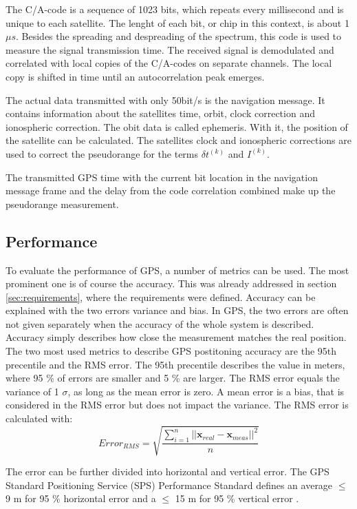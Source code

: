 The C/A-code is a sequence of 1023 bits, which repeats every millisecond and is unique to each satellite.
The lenght of each bit, or chip in this context, is about 1 $\mu s$.
Besides the spreading and despreading of the spectrum, this code is used to measure the signal transmission time.
The received signal is demodulated and correlated with local copies of the C/A-codes on separate channels.
The local copy is shifted in time until an autocorrelation peak emerges.

The actual data transmitted with only 50bit/s is the navigation message.
It contains information about the satellites time, orbit, clock correction and ionospheric correction.
The obit data is called ephemeris.
With it, the position of the satellite can be calculated.
The satellites clock and ionospheric corrections are used to correct the pseudorange for the terms $\delta t^{(k)}$ and $I^{(k)}$.

The transmitted GPS time with the current bit location in the navigation message frame and the delay from the code correlation combined make up the pseudorange measurement.

\subsection{Performance}

To evaluate the performance of GPS, a number of metrics can be used.
The most prominent one is of course the accuracy.
This was already addressed in section \ref{sec:requirements}, where the requirements were defined.
Accuracy can be explained with the two errors variance and bias.
In GPS, the two errors are often not given separately when the accuracy of the whole system is described.
Accuracy simply describes how close the measurement matches the real position.
The two most used metrics to describe GPS postitoning accuracy are the 95th precentile and the RMS error.
The 95th precentile describes the value in meters, where 95 \% of errors are smaller and 5 \% are larger.
The RMS error equals the variance of 1 $\sigma$, as long as the mean error is zero.
A mean error is a bias, that is considered in the RMS error but does not impact the variance.
The RMS error is calculated with:
\begin{equation}
 Error_{RMS} = \sqrt{\frac{\sum\limits_{i=1}^n \lvert\lvert \textbf{x}_{real} - \textbf{x}_{meas} \rvert\rvert^2}{n}}
\end{equation}

The error can be further divided into horizontal and vertical error.
The GPS Standard Positioning Service (SPS) Performance Standard defines an average $\leq$ 9 m for 95 \% horizontal error and a $\leq$ 15 m for 95 \% vertical error \cite{SPS_Performance}.

